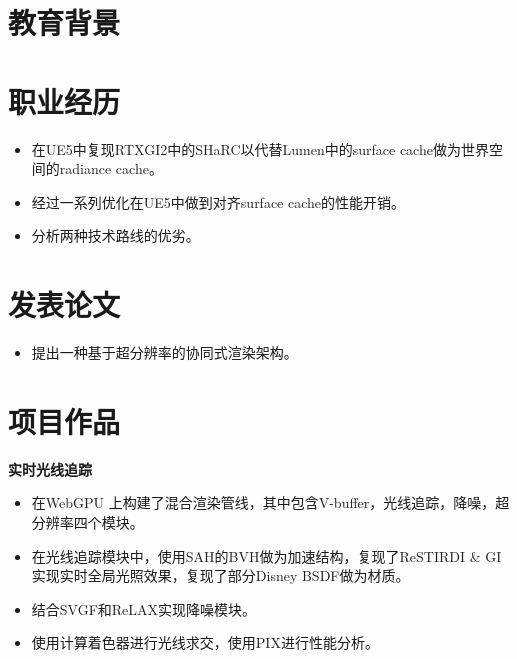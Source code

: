 \documentclass{resume}
\begin{document}



\section{教育背景}
\vspace{12pt}
\section{职业经历}
\begin{itemize}
  \item 在UE5中复现RTXGI2中的SHaRC以代替Lumen中的surface cache做为世界空间的radiance cache。
  \item 经过一系列优化在UE5中做到对齐surface cache的性能开销。
  \item 分析两种技术路线的优劣。
\end{itemize}
\section{发表论文}
\begin{itemize}
  \item 提出一种基于超分辨率的协同式渲染架构。
\end{itemize}

\section{项目作品}
\textbf{实时光线追踪}
\begin{itemize}
  \item 在WebGPU 上构建了混合渲染管线，其中包含V-buffer，光线追踪，降噪，超分辨率四个模块。
  \item 在光线追踪模块中，使用SAH的BVH做为加速结构，复现了ReSTIRDI \& GI 实现实时全局光照效果，复现了部分Disney BSDF做为材质。
  \item 结合SVGF和ReLAX实现降噪模块。
  \item 使用计算着色器进行光线求交，使用PIX进行性能分析。
\end{itemize}
\end{document}

